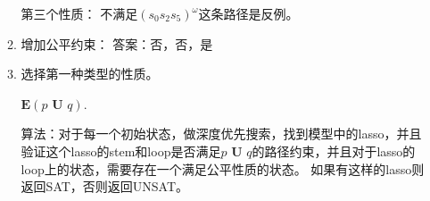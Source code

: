 \documentclass[UTF-8]{ctexart}
\begin{document}
\begin{enumerate}
\begin{enumerate}
第三个性质：
不满足$(s_0 s_2 s_5)^\omega$这条路径是反例。


\item 增加公平约束：
答案：否，否，是

\item 选择第一种类型的性质。

$\textbf{E}(p\textbf{ U }q)$.

算法：对于每一个初始状态，做深度优先搜索，找到模型中的lasso，并且验证这个lasso的stem和loop是否满足$p\textbf{ U }q$的路径约束，并且对于lasso的loop上的状态，需要存在一个满足公平性质的状态。
如果有这样的lasso则返回SAT，否则返回UNSAT。
\end{enumerate}
\end{enumerate}
\end{document}
